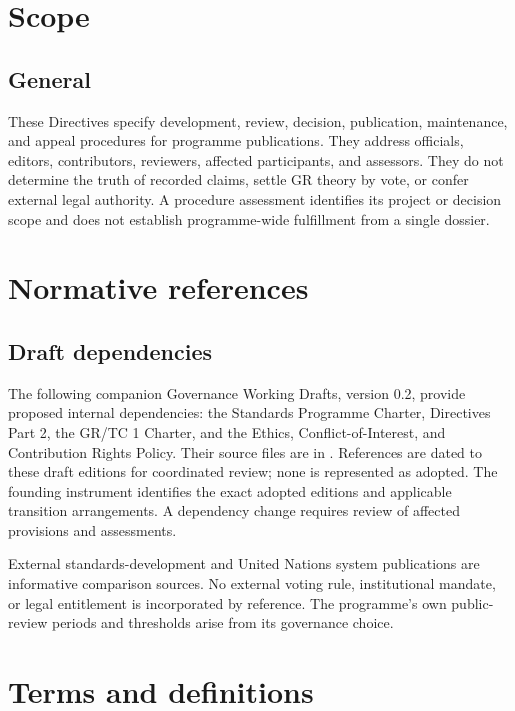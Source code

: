 \documentclass[11pt,a4paper]{article}
\begin{document}
\GSPmainmatter
\section{Scope}
\subsection{General}
These Directives specify development, review, decision, publication, maintenance, and appeal procedures for programme publications. They address officials, editors, contributors, reviewers, affected participants, and assessors. They do not determine the truth of recorded claims, settle GR theory by vote, or confer external legal authority. A procedure assessment identifies its project or decision scope and does not establish programme-wide fulfillment from a single dossier.


\section{Normative references}
\subsection{Draft dependencies}
The following companion Governance Working Drafts, version 0.2, provide proposed internal dependencies: the Standards Programme Charter, Directives Part 2, the GR/TC 1 Charter, and the Ethics, Conflict-of-Interest, and Contribution Rights Policy. Their source files are in . References are dated to these draft editions for coordinated review; none is represented as adopted. The founding instrument identifies the exact adopted editions and applicable transition arrangements. A dependency change requires review of affected provisions and assessments.

External standards-development and United Nations system publications are informative comparison sources. No external voting rule, institutional mandate, or legal entitlement is incorporated by reference. The programme's own public-review periods and thresholds arise from its governance choice.

\section{Terms and definitions}
\end{document}
